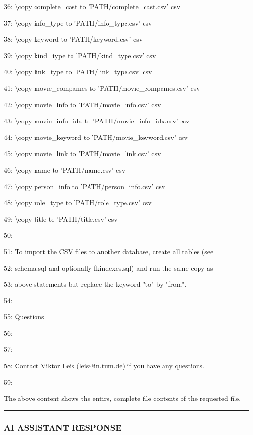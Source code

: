 \documentclass[11pt,a4paper]{article}
\begin{document}
36: \textbackslash{}copy complete\_cast to 'PATH/complete\_cast.csv' csv

37: \textbackslash{}copy info\_type to 'PATH/info\_type.csv' csv

38: \textbackslash{}copy keyword to 'PATH/keyword.csv' csv

39: \textbackslash{}copy kind\_type to 'PATH/kind\_type.csv' csv

40: \textbackslash{}copy link\_type to 'PATH/link\_type.csv' csv

41: \textbackslash{}copy movie\_companies to 'PATH/movie\_companies.csv' csv

42: \textbackslash{}copy movie\_info to 'PATH/movie\_info.csv' csv

43: \textbackslash{}copy movie\_info\_idx to 'PATH/movie\_info\_idx.csv' csv

44: \textbackslash{}copy movie\_keyword to 'PATH/movie\_keyword.csv' csv

45: \textbackslash{}copy movie\_link to 'PATH/movie\_link.csv' csv

46: \textbackslash{}copy name to 'PATH/name.csv' csv

47: \textbackslash{}copy person\_info to 'PATH/person\_info.csv' csv

48: \textbackslash{}copy role\_type to 'PATH/role\_type.csv' csv

49: \textbackslash{}copy title to 'PATH/title.csv' csv

50:

51: To import the CSV files to another database, create all tables (see

52: schema.sql and optionally fkindexes.sql) and run the same copy as

53: above statements but replace the keyword "to" by "from".

54:

55: Questions

56: ---------

57:

58: Contact Viktor Leis (leis@in.tum.de) if you have any questions.

59:

The above content shows the entire, complete file contents of the requested file.


\hrule

\subsubsection{AI ASSISTANT RESPONSE}
\end{document}
